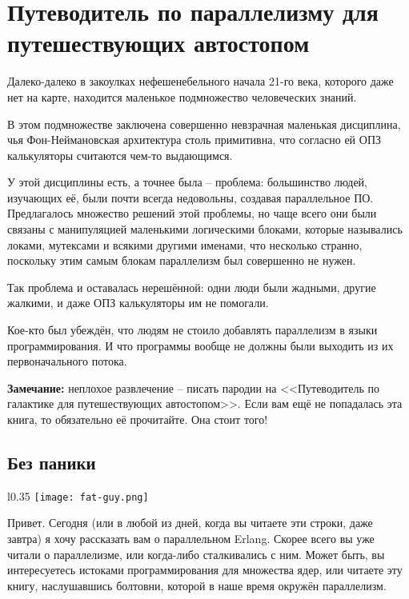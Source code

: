 \chapter{Путеводитель по параллелизму для путешествующих автостопом}
\label{the-hitchhikers-guide-to-concurrency}
Далеко\--далеко в закоулках нефешенебельного начала 21\--го века, которого даже нет на карте, находится маленькое подмножество человеческих знаний.

В этом подмножестве заключена совершенно невзрачная маленькая дисциплина, чья Фон\--Неймановская архитектура столь примитивна, что согласно ей ОПЗ калькуляторы считаются чем\--то выдающимся.

У этой дисциплины есть, а точнее была \--- проблема: большинство людей, изучающих её, были почти всегда недовольны, создавая параллельное ПО.
Предлагалось множество решений этой проблемы, но чаще всего они были связаны с манипуляцией маленькими логическими блоками, которые назывались локами, мутексами и всякими другими именами, что несколько странно, поскольку этим самым блокам параллелизм был совершенно не нужен.

Так проблема и оставалась нерешённой: одни люди были жадными, другие жалкими, и даже ОПЗ калькуляторы им не помогали.

Кое\--кто был убеждён, что людям не стоило добавлять параллелизм в языки программирования.
И что программы вообще не должны были выходить из их первоначального потока.
\\
\colorbox{lgray}
{
\begin{minipage}{1.0\linewidth}
    \textbf{Замечание:} неплохое развлечение \--- писать пародии на <<Путеводитель по галактике для путешествующих автостопом>>.
    Если вам ещё не попадалась эта книга, то обязательно её прочитайте.
    Она стоит того!
\end{minipage}
}
\section{Без паники}
\label{dont-panic}
\begin{wrapfigure}{l}{0.35\linewidth}
    \texttt{[image: fat-guy.png]}
\end{wrapfigure}
Привет.
Сегодня (или в любой из дней, когда вы читаете эти строки, даже завтра) я хочу рассказать вам о параллельном Erlang.
Скорее всего вы уже читали о параллелизме, или когда\--либо сталкивались с ним.
Может быть, вы интересуетесь истоками программирования для множества ядер, или читаете эту книгу, наслушавшись болтовни, которой в наше время окружён параллелизм.

